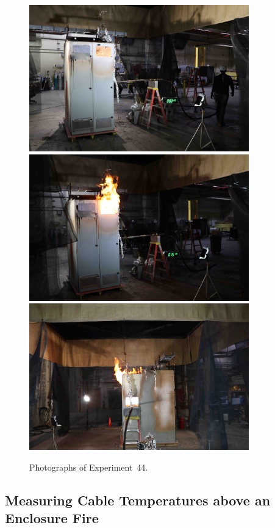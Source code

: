 \begin{figure}[p]
\centering
\includegraphics[height=2.50in]{../FIGURES/Test_44_start} \\
\includegraphics[height=2.50in]{../FIGURES/Test_44_15_min_19_s} \\
\includegraphics[height=2.50in]{../FIGURES/Test_44_side}
\caption[Photographs of Experiment~44]{Photographs of Experiment~44.}
\label{fig:Test_44_photos}
\end{figure}


\clearpage


\subsection{Measuring Cable Temperatures above an Enclosure Fire}

